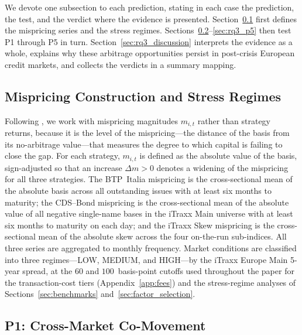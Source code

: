 We devote one subsection to each prediction, stating in each case the
prediction, the test, and the verdict where the evidence is presented.
Section~\ref{sec:rq3_construction} first defines the mispricing series
and the stress regimes. Sections~\ref{sec:rq3_p1}--\ref{sec:rq3_p5}
then test P1 through P5 in turn. Section~\ref{sec:rq3_discussion}
interprets the evidence as a whole, explains why these arbitrage
opportunities persist in post-crisis European credit markets, and
collects the verdicts in a summary mapping.



\subsection{Mispricing Construction and Stress Regimes}
\label{sec:rq3_construction}

Following \citet{duffie2010presidential}, we work with mispricing
magnitudes $m_{i,t}$ rather than strategy returns, because it is the
level of the mispricing---the distance of the basis from its
no-arbitrage value---that measures the degree to which capital is
failing to close the gap. For each strategy, $m_{i,t}$ is defined as
the absolute value of the basis, sign-adjusted so that an increase
$\Delta m > 0$ denotes a widening of the mispricing for all three
strategies. The BTP~Italia mispricing is the cross-sectional mean of the absolute
basis across all outstanding issues with at least six months to
maturity; the CDS--Bond mispricing is the cross-sectional mean of the absolute 
value of all negative single-name bases in the iTraxx Main universe with at least
six months to maturity on each day; and the iTraxx Skew mispricing is the
cross-sectional mean of the absolute skew across the four on-the-run
sub-indices. All three series are aggregated to monthly frequency.
Market conditions are classified into three regimes---LOW, MEDIUM, and
HIGH---by the iTraxx Europe Main 5-year spread, at the $60$ and
$100$~basis-point cutoffs used throughout the paper for the
transaction-cost tiers (Appendix~\ref{app:fees}) and the stress-regime
analyses of Sections~\ref{sec:benchmarks}
and~\ref{sec:factor_selection}.



\subsection{P1: Cross-Market Co-Movement}
\label{sec:rq3_p1}

